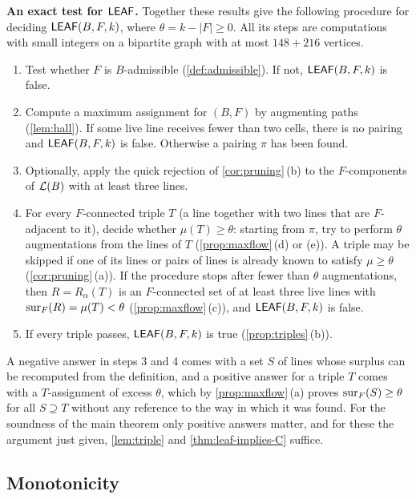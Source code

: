 \medskip\noindent\textbf{An exact test for $\mathsf{LEAF}$.}
Together these results give the following procedure for deciding $\mathsf{LEAF}(B,F,k)$, where
$\theta=k-|F|\ge 0$. All its steps are computations with small integers on a bipartite graph with at
most $148+216$ vertices.
\begin{enumerate}[label=\textup{\arabic*.}]
\item Test whether $F$ is $B$-admissible (\cref{def:admissible}). If not, $\mathsf{LEAF}(B,F,k)$ is false.
\item Compute a maximum assignment for $(B,F)$ by augmenting paths (\cref{lem:hall}). If some live line
      receives fewer than two cells, there is no pairing and $\mathsf{LEAF}(B,F,k)$ is false. Otherwise a pairing
      $\pi$ has been found.
\item Optionally, apply the quick rejection of \cref{cor:pruning}\,(b) to the $F$-components of
      $\mathcal{L}(B)$ with at least three lines.
\item For every $F$-connected triple $T$ (a line together with two lines that are $F$-adjacent to it),
      decide whether $\mu(T)\ge\theta$: starting from $\pi$, try to perform $\theta$ augmentations from
      the lines of $T$ (\cref{prop:maxflow}\,(d) or (e)). A triple may be skipped if one of its lines or
      pairs of lines is already known to satisfy $\mu\ge\theta$ (\cref{cor:pruning}\,(a)). If the
      procedure stops after fewer than $\theta$ augmentations, then $R=R_\alpha(T)$ is an $F$-connected
      set of at least three live lines with $\operatorname{sur}_F(R)=\mu(T)<\theta$ (\cref{prop:maxflow}\,(c)), and
      $\mathsf{LEAF}(B,F,k)$ is false.
\item If every triple passes, $\mathsf{LEAF}(B,F,k)$ is true (\cref{prop:triples}\,(b)).
\end{enumerate}
A negative answer in steps 3 and 4 comes with a set $S$ of lines whose surplus can be recomputed from
the definition, and a positive answer for a triple $T$ comes with a $T$-assignment of excess $\theta$,
which by \cref{prop:maxflow}\,(a) proves $\operatorname{sur}_F(S)\ge\theta$ for all $S\supseteq T$ without any reference
to the way in which it was found. For the soundness of the main theorem only positive answers matter,
and for these the argument just given, \cref{lem:triple} and \cref{thm:leaf-implies-C} suffice.

\subsection{Monotonicity}\label{ssec:monotone}

